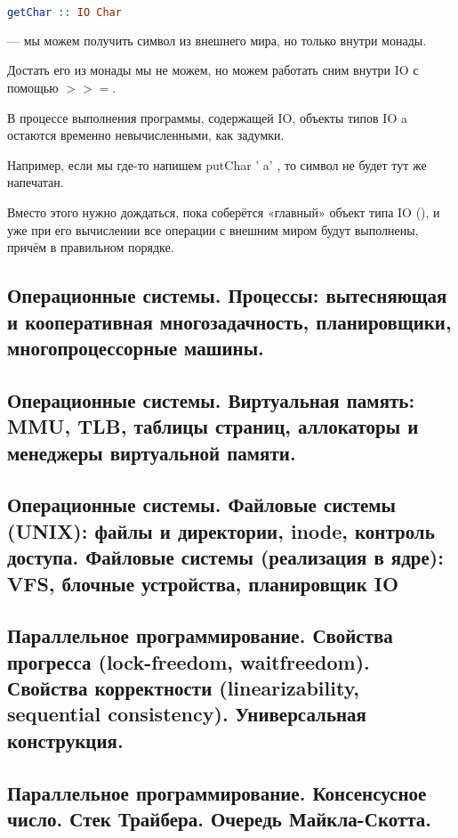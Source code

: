 \documentclass{article}
\begin{document}
\begin{lstlisting}[language=Haskell]
getChar :: IO Char
\end{lstlisting} --- мы можем получить символ из внешнего мира, но только внутри монады.

Достать его из монады мы не можем, но можем работать сним внутри IO с помощью $>>=$.

В процессе выполнения программы, содержащей IO, объекты типов IO a остаются временно невычисленными, как задумки.

Например, если мы где-то напишем putChar ' a' , то символ не будет тут же напечатан.

Вместо этого нужно дождаться, пока соберётся «главный» объект типа IO (), и уже при его вычислении все операции с внешним миром будут выполнены, причём в правильном порядке.

\subsection{Операционные системы. Процессы: вытесняющая и кооперативная многозадачность, планировщики, многопроцессорные машины.}

\subsection{Операционные системы. Виртуальная память: MMU, TLB, таблицы страниц, аллокаторы и менеджеры виртуальной памяти.}

\subsection{Операционные системы. Файловые системы (UNIX): файлы и директории, inode, контроль доступа. Файловые системы (реализация в ядре): VFS, блочные устройства, планировщик IO}

\subsection{Параллельное программирование. Свойства прогресса (lock-freedom, waitfreedom). Свойства корректности (linearizability, sequential consistency). Универсальная конструкция.}

\subsection{Параллельное программирование. Консенсусное число. Стек Трайбера. Очередь Майкла-Скотта.}
\end{document}
